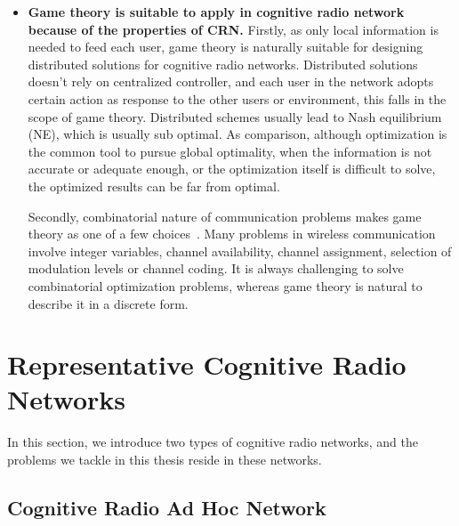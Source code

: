 \begin{itemize}
\item \textbf{Game theory is suitable to apply in cognitive radio network because of the properties of CRN.}
Firstly, as only local information is needed to feed each user, game theory is naturally suitable for designing distributed solutions for cognitive radio networks.
Distributed solutions doesn't rely on centralized controller, and each user in the network adopts certain action as response to the other users or environment, this falls in the scope of game theory.
Distributed schemes usually lead to Nash equilibrium (\gls{NE}), which is usually sub optimal.
As comparison, although optimization is the common tool to pursue global optimality, when the information is not accurate or adequate enough, or the optimization itself is difficult to solve, the optimized results can be far from optimal.

%
Secondly, combinatorial nature of communication problems makes game theory as one of a few choices~\cite{Han:2008:RAW:1457343}.
Many problems in wireless communication involve integer variables, \ie channel availability, channel assignment, selection of modulation levels or channel coding.
It is always challenging to solve combinatorial optimization problems, whereas game theory is natural to describe it in a discrete form.

\end{itemize}




\section{Representative Cognitive Radio Networks}
In this section, we introduce two types of cognitive radio networks, and the problems we tackle in this thesis reside in these networks.

\subsection{Cognitive Radio Ad Hoc Network}


